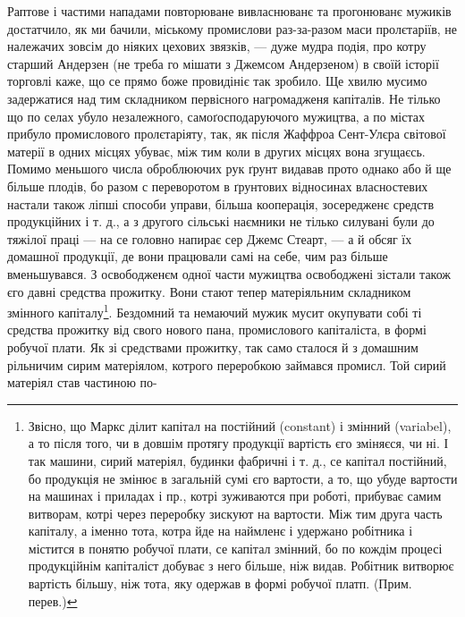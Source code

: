Раптове і частими нападами повторюване вивласнюванє
та прогонюванє мужиків достатчило, як ми бачили,
міському промислови раз-за-разом маси пролєтаріїв, не належачих
зовсім до ніяких цехових звязків, — дуже мудра
подія, про котру старший Андерзен (не треба го мішати
з Джемсом Андерзеном) в своїй історії торговлі каже, що
се прямо боже провидініє так зробило. Ще хвилю мусимо
задержатися над тим складником первісного нагромадженя
капіталів. Не тілько що по селах убуло незалежного, самоґосподаруючого
мужицтва, а по містах прибуло промислового
пролєтаріяту, так, як після Жаффроа Сент-Улєра світової
матерії в одних місцях убуває, між тим коли в других
місцях вона згущаєсь. Помимо меньшого числа оброблюючих
рук ґрунт видавав прото однако або й ще більше
плодів, бо разом с переворотом в ґрунтових відносинах
власностевих настали також ліпші способи управи, більша
кооперація, зосередженє средств продукційних і т. д., а з другого
сільські наємники не тілько силувані були до тяжілої
праці — на се головно напирає сер Джемс Стеарт, —
а й обсяг їх домашної продукції, де вони працювали самі
на себе, чим раз більше вменьшувався. З освободженєм
одної части мужицтва освободжені зістали також єго давні
средства прожитку. Вони стают тепер матеріяльним складником
змінного капіталу\footnote*{
Звісно, що Маркс ділит капітал на постійний (constant) і змінний
(variabel), а то після того, чи в довшім протягу продукції вартість
єго зміняєся, чи ні. І так машини, сирий матеріял, будинки фабричні
і т. д., се капітал постійний, бо продукція не змінює в загальній сумі
єго вартости, а то, що убуде вартости на машинах і приладах і пр.,
котрі зуживаются при роботі, прибуває самим витворам, котрі через переробку
зискуют на вартости. Між тим друга часть капіталу, а іменно
тота, котра йде на наймленє і удержано робітника і містится в понятю
робучої плати, се капітал змінний, бо по кождім процесі продукційнім
капіталіст добуває з него більше, ніж видав. Робітник витворює вартість
більшу, ніж тота, яку одержав в формі робучої платп. (Прим. перев.)
}. Бездомний та немаючий мужик
мусит окупувати собі ті средства прожитку від свого
нового пана, промислового капіталіста, в формі робучої
плати. Як зі средствами прожитку, так само сталося й з домашним
рільничим сирим матеріялом, котрого переробкою
займався промисл. Той сирий матеріял став частиною по-

